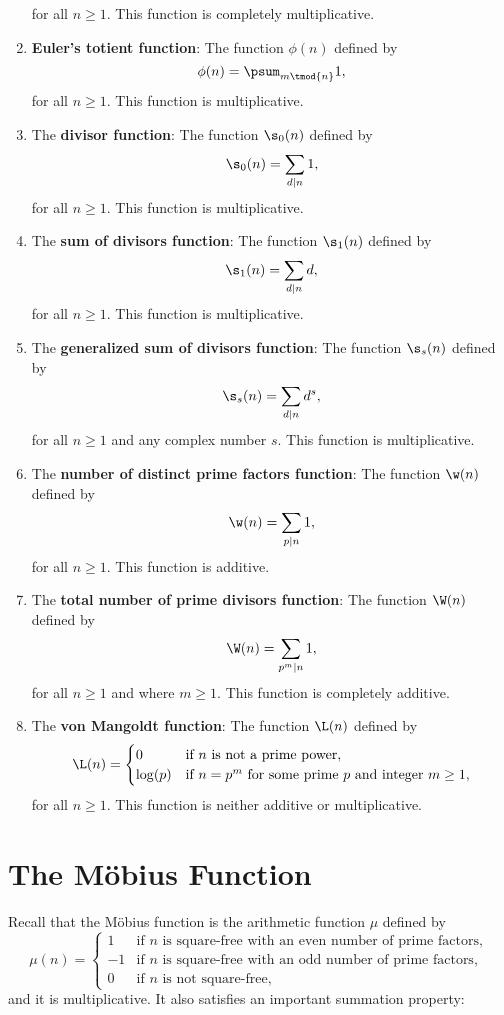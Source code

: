 \begin{enumerate}[label=(\roman*)]
\[      \]
      for all $n \ge 1$. This function is completely multiplicative.
      \item \textbf{Euler's totient function}: The function $\phi(n)$ defined by
      \[
        \phi(n) = \psum_{m \tmod{n}}1,
      \]
      for all $n \ge 1$. This function is multiplicative.
      \item The \textbf{divisor function}: The function $\s_{0}(n)$ defined by
      \[
        \s_{0}(n) = \sum_{d \mid n}1,
      \]
      for all $n \ge 1$. This function is multiplicative.
      \item The \textbf{sum of divisors function}: The function $\s_{1}(n)$ defined by
      \[
        \s_{1}(n) = \sum_{d \mid n}d,
      \]
      for all $n \ge 1$. This function is multiplicative.
      \item The \textbf{generalized sum of divisors function}: The function $\s_{s}(n)$ defined by
      \[
        \s_{s}(n) = \sum_{d \mid n}d^{s},
      \]
      for all $n \ge 1$ and any complex number $s$. This function is multiplicative.
      \item The \textbf{number of distinct prime factors function}: The function $\w(n)$ defined by
      \[
        \w(n) = \sum_{p \mid n}1,
      \]
      for all $n \ge 1$. This function is additive.
      \item The \textbf{total number of prime divisors function}: The function $\W(n)$ defined by
      \[
        \W(n) = \sum_{p ^{m} \mid n}1,
      \]
      for all $n \ge 1$ and where $m \ge 1$. This function is completely additive.
      \item The \textbf{von Mangoldt function}: The function $\L(n)$ defined by
      \[
        \L(n) = \begin{cases} 0 & \text{if $n$ is not a prime power}, \\ \log(p) & \text{if $n = p^{m}$ for some prime $p$ and integer $m \ge 1$}, \end{cases}
      \]
      for all $n \ge 1$. This function is neither additive or multiplicative.
    \end{enumerate}
  \section{The M\"obius Function}
    Recall that the M\"obius function is the arithmetic function $\mu$ defined by
    \[
      \mu(n) = \begin{cases} 1 & \text{if $n$ is square-free with an even number of prime factors}, \\ -1 & \text{if $n$ is square-free with an odd number of prime factors}, \\ 0 & \text{if $n$ is not square-free}, \end{cases}
    \]
    and it is multiplicative. It also satisfies an important summation property:

